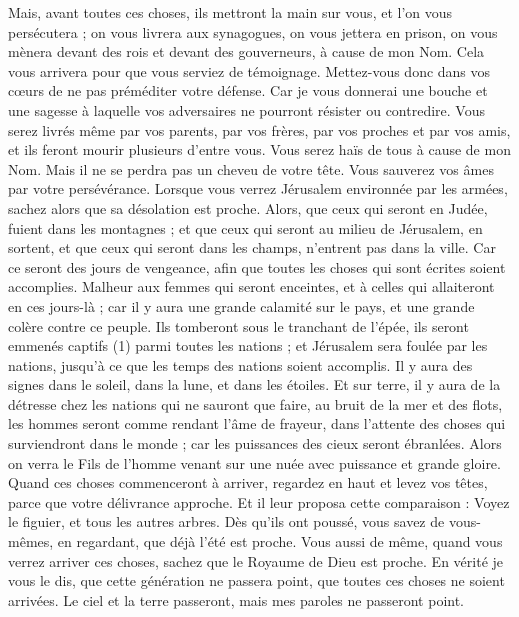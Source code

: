 \begin{multicols}{2}
Mais, avant toutes ces choses, ils mettront la main sur vous, et l’on vous persécutera ; on vous livrera aux synagogues, on vous jettera en prison, on vous mènera devant des rois et devant des gouverneurs, à cause de mon Nom.
Cela vous arrivera pour que vous serviez de témoignage.
Mettez-vous donc dans vos cœurs de ne pas préméditer votre défense.
Car je vous donnerai une bouche et une sagesse à laquelle vos adversaires ne pourront résister ou contredire.
Vous serez livrés même par vos parents, par vos frères, par vos proches et par vos amis, et ils feront mourir plusieurs d'entre vous.
Vous serez haïs de tous à cause de mon Nom.
Mais il ne se perdra pas un cheveu de votre tête.
Vous sauverez vos âmes par votre persévérance.
Lorsque vous verrez Jérusalem environnée par les armées, sachez alors que sa désolation est proche.
Alors, que ceux qui seront en Judée, fuient dans les montagnes ; et que ceux qui seront au milieu de Jérusalem, en sortent, et que ceux qui seront dans les champs, n'entrent pas dans la ville.
Car ce seront des jours de vengeance, afin que toutes les choses qui sont écrites soient accomplies.
Malheur aux femmes qui seront enceintes, et à celles qui allaiteront en ces jours-là ; car il y aura une grande calamité sur le pays, et une grande colère contre ce peuple.
Ils tomberont sous le tranchant de l'épée, ils seront emmenés captifs (1) parmi toutes les nations ; et Jérusalem sera foulée par les nations, jusqu'à ce que les temps des nations soient accomplis.
Il y aura des signes dans le soleil, dans la lune, et dans les étoiles. Et sur terre, il y aura de la détresse chez les nations qui ne sauront que faire, au bruit de la mer et des flots,
les hommes seront comme rendant l'âme de frayeur, dans l'attente des choses qui surviendront dans le monde ; car les puissances des cieux seront ébranlées.
Alors on verra le Fils de l'homme venant sur une nuée avec puissance et grande gloire.
Quand ces choses commenceront à arriver, regardez en haut et levez vos têtes, parce que votre délivrance approche.
Et il leur proposa cette comparaison : Voyez le figuier, et tous les autres arbres.
Dès qu’ils ont poussé, vous savez de vous-mêmes, en regardant, que déjà l’été est proche.
Vous aussi de même, quand vous verrez arriver ces choses, sachez que le Royaume de Dieu est proche.
En vérité je vous le dis, que cette génération ne passera point, que toutes ces choses ne soient arrivées.
Le ciel et la terre passeront, mais mes paroles ne passeront point.

\end{multicols}
